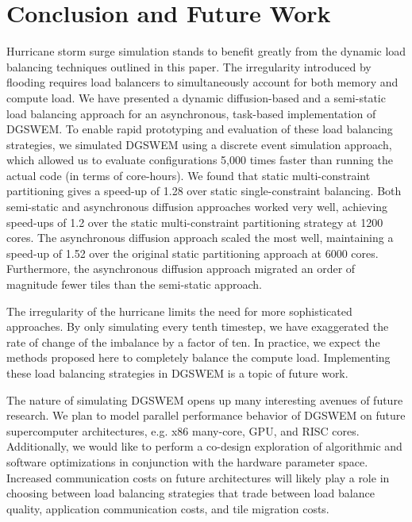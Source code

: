 \section{Conclusion and Future Work}


Hurricane storm surge simulation stands to benefit greatly from the dynamic load balancing techniques outlined in this paper. 
The irregularity introduced by flooding requires load balancers to simultaneously account for both memory and compute load.
We have presented a dynamic diffusion-based and a semi-static load balancing approach for an asynchronous, task-based implementation of DGSWEM.
To enable rapid prototyping and evaluation of these load balancing strategies, we simulated DGSWEM using a discrete event simulation approach, which
allowed us to evaluate configurations 5,000 times faster than running the actual code (in terms of core-hours).
We found that static multi-constraint partitioning gives a speed-up of 1.28 over static single-constraint balancing. Both semi-static and asynchronous diffusion approaches worked very well, achieving speed-ups of 1.2 over the static multi-constraint partitioning strategy at 1200 cores. The asynchronous diffusion approach scaled the most well, maintaining a speed-up of 1.52 over the original static partitioning approach at 6000 cores. Furthermore, the asynchronous diffusion approach migrated an order of magnitude fewer tiles than the semi-static approach.

The irregularity of the hurricane limits the need for more sophisticated approaches. By only simulating every tenth timestep, we have exaggerated the rate of change of the imbalance by a factor of ten. In practice, we expect the methods proposed here to completely balance the compute load. Implementing these load balancing strategies in DGSWEM is a topic of future work.

The nature of simulating DGSWEM opens up many interesting avenues of future research.
We plan to model parallel performance behavior of DGSWEM on future supercomputer architectures, e.g. x86 many-core, GPU, and RISC cores.
Additionally, we would like to perform a co-design exploration of algorithmic and software optimizations in conjunction with the hardware parameter space.
Increased communication costs on future architectures will likely play a role in choosing between load balancing strategies that trade between load balance quality, application communication costs, and tile migration costs.
